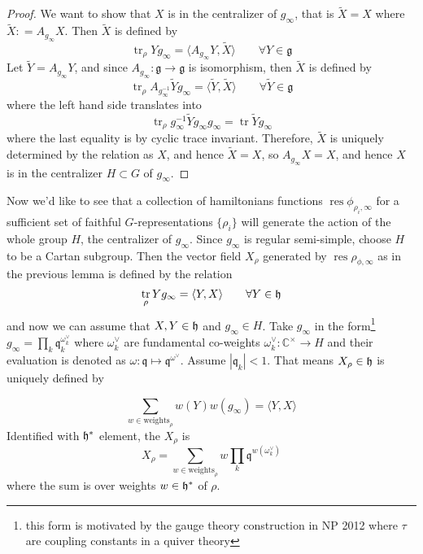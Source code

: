 \documentclass[11pt, oneside, reqno]{amsart}
\theoremstyle{definition} \newtheorem{definition}{Definition}[section]
\theoremstyle{definition} \newtheorem{remark}[definition]{Remark}
\theoremstyle{definition} \newtheorem{remarks}[definition]{Remarks}
\theoremstyle{definition} \newtheorem{question}[definition]{Question}
\theoremstyle{definition} \newtheorem*{note}{Note}
\theoremstyle{definition} \newtheorem{example}[definition]{Example}
\theoremstyle{definition} \newtheorem{examples}[definition]{Examples}
\renewcommand{\gg}{\mathfrak{g}}
\DeclareMathOperator{\tr}{tr}
\DeclareMathOperator{\res}{res}
\begin{document}
\begin{proof}
We want to show that $X$ is in the centralizer of $g_\infty$, that is $\tilde X = X$
where $\tilde X: = A_{g_\infty} X$. Then $\tilde X$ is defined by 
\begin{equation}
  \tr_{\rho} Y g_\infty  = \langle A_{g_\infty} Y, \tilde X \rangle \qquad \forall Y \in \gg
\end{equation}
Let $\tilde Y =  A_{g_\infty} Y$, and since $A_{g_\infty}: \gg \to \gg$ is isomorphism,
then $\tilde X$ is defined by 
\begin{equation}
  \tr_{\rho}  A_{g_\infty^{-1}} \tilde Y g_\infty  = \langle \tilde Y, \tilde X \rangle \qquad \forall \tilde Y \in \gg
\end{equation}
where the left hand side translates into
\begin{equation}
  \tr_{\rho} g_\infty^{-1} \tilde Y g_\infty g_{\infty} = \tr \tilde Y g_\infty 
\end{equation}
where the last equality is by cyclic trace invariant. Therefore, $\tilde X$ is
uniquely determined by the relation as $X$, and hence $\tilde X = X$, so $A_{g_\infty} X = X$,
and hence $X$ is in the centralizer $H \subset G$ of $g_\infty$. 
\end{proof}



Now we'd like to see that a collection of hamiltonians functions $\res \phi_{\rho_i, \infty}$
for a sufficient set of faithful $G$-representations $\{ \rho_i \}$ will
generate the action of the whole group $H$, the centralizer of $g_\infty$.
Since $g_\infty$ is regular semi-simple, choose $H$ to be a Cartan subgroup.
Then the vector field $X_\rho$ generated by $\res \rho_{\phi, \infty}$ as in the previous lemma is
defined by the relation 
\begin{equation}
    \tr_{\rho} Y g_\infty  = \langle Y, X \rangle \qquad \forall Y \in \hh
  \end{equation}
  and now we can assume that  $X, Y \in \mathfrak{h}$ and $g_\infty \in H$. Take $g_\infty$
  in the form\footnote{this form
    is motivated by the gauge theory construction in NP 2012 where $\tau$
  are coupling constants in a quiver theory} 
\newcommand{\qq}{\mathfrak{q}}
  $g_\infty =   \prod_{k} \qq_k ^{\omega_k^{\vee}}$
  where $\omega_k^{\vee}$ are fundamental co-weights $\omega_{k}^{\vee}: \mathbb{C}^{\times} \to H$
and their evaluation is  denoted as $\omega: \qq \mapsto \qq^{\omega^{\vee}}$. Assume $|\qq_k | < 1$. 
  That means $X_\rho \in \mathfrak{h}$ is uniquely defined by 

\begin{equation}
    \sum_{w \in \mathrm{weights}_{\rho}} w(Y) w(g_\infty)  = \langle Y, X \rangle 
  \end{equation}
 Identified with $\mathfrak{h}^{*}$ element, the $X_\rho$ is 
  \begin{equation}
\label{eq:Xrho}
    X_{\rho} = \sum_{w \in \mathrm{weights}_{\rho}} w   \prod_{k} \qq^{w(\omega_k^{\vee})}
  \end{equation}
  where the sum is over weights $w \in \mathfrak{h}^{*}$  of $\rho$. 
\end{document}
